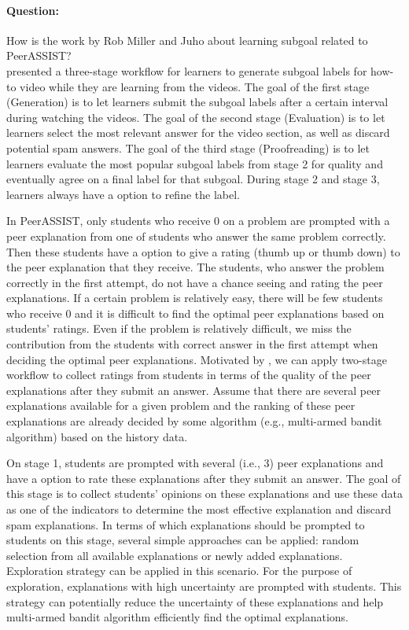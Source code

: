 \documentclass{article}
\begin{document}
\paragraph{Question:} How is the work by Rob Miller and Juho about
learning subgoal related to PeerASSIST? \\ [0.1 in]

\cite{Weir2015-hg} presented a three-stage workflow for learners to generate
subgoal labels for how-to video while they are learning from the
videos. The goal of the first stage (Generation) is to let learners submit the
subgoal labels after a certain interval during watching the
videos. The goal of the second stage (Evaluation) is to let learners select the
most relevant answer for the video section, as well as discard
potential spam answers. The goal of the third stage (Proofreading) is
to let learners evaluate the most popular subgoal labels from stage 2
for quality and eventually agree on a final label for that
subgoal. During stage 2 and stage 3, learners always have a option to
refine the label.

In PeerASSIST, only students who receive 0 on a problem are
prompted with a peer explanation from one of students who answer the same
problem correctly. Then these students have a option to give a rating
(thumb up or thumb down) to the peer explanation that they
receive. The students, who answer the problem correctly in the first
attempt, do not have a chance seeing and rating the peer
explanations. If
a certain problem is relatively easy, there will be few students who
receive 0 and it is difficult to find the optimal peer explanations
based on students' ratings. Even if the problem is relatively
difficult, we miss the contribution from the students with correct
answer in the first attempt when deciding the optimal peer
explanations. Motivated by \cite{Weir2015-hg}, we can apply two-stage
workflow to collect ratings from students in terms of the quality of
the peer explanations after they submit an answer. Assume that there
are several peer explanations available for a given problem and the
ranking of these peer explanations are already decided by some
algorithm (e.g., multi-armed bandit algorithm) based on the history data.

On stage 1, students are prompted with several (i.e., 3) peer
explanations and have a option to rate these explanations after they
submit an answer. The goal of this stage is to collect students'
opinions on these explanations and use these data as one of the
indicators to determine the most effective explanation and discard
spam explanations. In terms of
which explanations should be prompted to students on this stage,
several simple approaches can be applied: random selection from all
available explanations or newly added explanations. Exploration strategy can be applied in this scenario. For the purpose of
exploration, explanations with high uncertainty are prompted with
students. This strategy can potentially reduce the uncertainty of
these explanations and help multi-armed bandit algorithm efficiently
find the optimal explanations.
\end{document}
